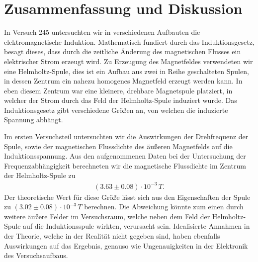 \section{Zusammenfassung und Diskussion}

In Versuch 245 untersuchten wir in verschiedenen Aufbauten die elektromagnetische Induktion. Mathematisch fundiert durch das Induktionsgesetz, besagt dieses, dass durch die zeitliche Änderung des magnetischen Flusses ein elektrischer Strom erzeugt wird. Zu Erzeugung des Magnetfeldes verwendeten wir eine Helmholtz-Spule, dies ist ein Aufbau aus zwei in Reihe geschalteten Spulen, in dessen Zentrum ein nahezu homogenes Magnetfeld erzeugt werden kann. In eben diesem Zentrum war eine kleinere, drehbare Magnetspule platziert, in welcher der Strom durch das Feld der Helmholtz-Spule induziert wurde. Das Induktionsgesetz gibt verschiedene Größen an, von welchen die induzierte Spannung abhängt.

Im ersten Versuchsteil untersuchten wir die Auswirkungen der Drehfrequenz der Spule, sowie der magnetischen Flussdichte des äußeren Magnetfelds auf die Induktionsspannung. Aus den aufgenommenen Daten bei der Untersuchung der Frequenzabhängigkeit berechneten wir die magnetische Flussdichte im Zentrum der Helmholtz-Spule zu
\begin{align*}
  (3.63 \pm 0.08) \cdot 10^{-3}\, \si{T}.
\end{align*}
Der theoretische Wert für diese Größe lässt sich aus den Eigenschaften der Spule zu $(3.02 \pm 0.08) \cdot 10^{-3}\, \si{T}$ berechnen. Die Abweichung könnte zum einen durch weitere äußere Felder im Versuchsraum, welche neben dem Feld der Helmholtz-Spule auf die Induktionsspule wirkten, verursacht sein. Idealisierte Annahmen in der Theorie, welche in der Realität nicht gegeben sind, haben ebenfalls Auswirkungen auf das Ergebnis, genauso wie Ungenauigkeiten in der Elektronik des Versuchsaufbaus.

